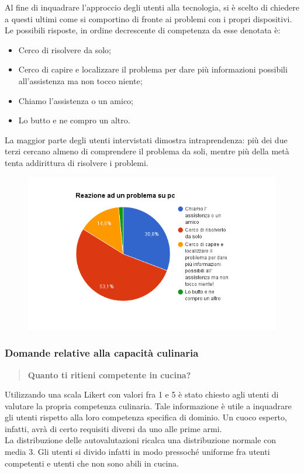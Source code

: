 Al fine di inquadrare l'approccio degli utenti alla tecnologia, si è 
scelto di chiedere a questi ultimi come si comportino di fronte ai problemi con
i propri dispositivi. Le possibili risposte, in ordine decrescente di competenza da esse denotata
è:
\begin{itemize}
 \item Cerco di risolvere da solo;
 \item Cerco di capire e localizzare il problema per dare più informazioni possibili all'assistenza ma non tocco niente;
 \item Chiamo l'assistenza o un amico;
 \item Lo butto e ne compro un altro.
\end{itemize}

La maggior parte degli utenti intervistati dimostra intraprendenza: più dei due terzi cercano almeno di comprendere
il problema da soli, mentre più della metà tenta addirittura di risolvere i problemi.

\begin{figure}[H]
	\centering
	\includegraphics[scale=0.6]{img/chart_reazione_problema_pc}
\end{figure}

\subsubsection{Domande relative alla capacità culinaria}

\begin{quote}
	\textbf{Quanto ti ritieni competente in cucina?}
\end{quote}

Utilizzando una scala Likert con valori fra 1 e 5 è stato chiesto agli utenti di valutare la propria competenza culinaria.
Tale informazione è utile a inquadrare gli utenti rispetto alla loro competenza specifica di dominio. Un cuoco esperto, infatti,
avrà di certo requisiti diversi da uno alle prime armi.
\\
La distribuzione delle autovalutazioni ricalca una distribuzione normale con media 3. Gli utenti si divido infatti in modo
pressoché uniforme fra utenti competenti e utenti che non sono abili in cucina.


